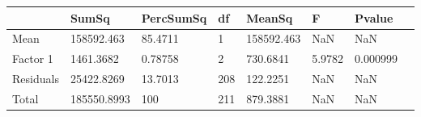 \begin{table} 
\begin{tabular}{llllllll}
 & SumSq & PercSumSq & df & MeanSq & F & Pvalue \\ 
 \hline 
Mean & 158592.463 & 85.4711 & 1 & 158592.463 & NaN & NaN \\ 
Factor 1 & 1461.3682 & 0.78758 & 2 & 730.6841 & 5.9782 & 0.000999 \\ 
Residuals & 25422.8269 & 13.7013 & 208 & 122.2251 & NaN & NaN \\ 
Total & 185550.8993 & 100 & 211 & 879.3881 & NaN & NaN \\ 
\end{tabular} 
\end{table} 
